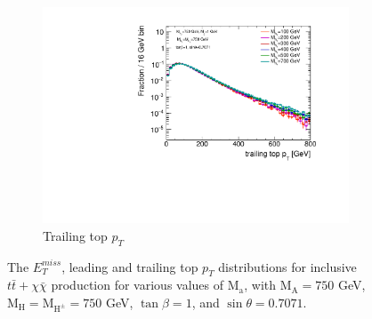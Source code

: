 \begin{figure}
\begin{subfigure}[b]{0.49\textwidth}
    \includegraphics[width=\textwidth]{texinputs/04_grid/figures/DMHF/benchmarking/MDM_1_MA_750_sinp_0.7071_tanb_1.0_SCAN_Ma/top2ptlog.pdf}
    \caption{Trailing top $p_{T}$}
  \end{subfigure}
  \caption{The $E_{T}^{miss}$, leading and trailing top $p_{T}$ distributions for inclusive $t\bar{t}+\chi\bar{\chi}$ production for various values of $\mathrm{M_a}$, with $\mathrm{M_A}=750$ GeV, $\mathrm{M_H}=\mathrm{M_{H^{\pm}}}=750$ GeV, $\tan\beta=1$, and $\sin\theta=0.7071$.}
  \label{fig:kin_Ma}
\end{figure}

